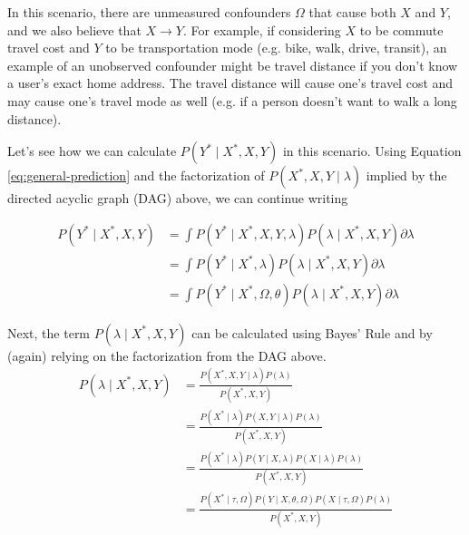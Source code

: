 \documentclass{article}
\begin{document}
In this scenario, there are unmeasured confounders $\Omega$ that cause both $X$ and $Y$, and we also believe that $X \rightarrow Y$. For example, if considering $X$ to be commute travel cost and $Y$ to be transportation mode (e.g. bike, walk, drive, transit), an example of an unobserved confounder might be travel distance if you don't know a user's exact home address. The travel distance will cause one's travel cost and may cause one's travel mode as well (e.g. if a person doesn't want to walk a long distance).

Let's see how we can calculate $P \left( Y^{*} \mid X^{*}, X, Y \right)$ in this scenario. Using Equation \ref{eq:general-prediction} and the factorization of $P \left( X^{*}, X, Y \mid \lambda \right)$ implied by the directed acyclic graph (DAG) above, we can continue writing

\begin{equation}
\label{eq:prediction-simplified-1}
\begin{aligned}
P \left( Y^{*} \mid X^{*}, X, Y \right) &=  \int P \left( Y^{*} \mid X^{*}, X, Y, \lambda \right) P \left( \lambda \mid X^{*}, X, Y \right) \partial \lambda\\
&= \int P \left( Y^{*} \mid X^{*}, \lambda \right) P \left( \lambda \mid X^{*}, X, Y \right) \partial \lambda\\
&= \int P \left( Y^{*} \mid X^{*}, \Omega, \theta \right) P \left( \lambda \mid X^{*}, X, Y \right) \partial \lambda
\end{aligned}
\end{equation}

Next, the term $P \left( \lambda \mid X^{*}, X, Y \right)$ can be calculated using Bayes' Rule and by (again) relying on the factorization from the DAG above.
\begin{equation}
\label{eq:lambda-given-everything}
\begin{aligned}
P \left( \lambda \mid X^{*}, X, Y \right) &= \frac{P \left( X^{*}, X, Y \mid \lambda \right) P \left( \lambda \right)}{P \left( X^{*}, X, Y \right)}\\
&= \frac{P \left( X^{*} \mid \lambda \right) P \left( X, Y \mid \lambda \right) P \left( \lambda \right)}{P \left( X^{*}, X, Y \right)}\\
&= \frac{P \left( X^{*} \mid \lambda \right) P \left( Y \mid X, \lambda \right) P \left( X \mid \lambda \right) P \left( \lambda \right)}{P \left( X^{*}, X, Y \right)}\\
&= \frac{P \left( X^{*} \mid \tau, \Omega \right) P \left( Y \mid X, \theta, \Omega \right) P \left( X \mid \tau, \Omega \right) P \left( \lambda \right)}{P \left( X^{*}, X, Y \right)}
\end{aligned}
\end{equation}
\end{document}
